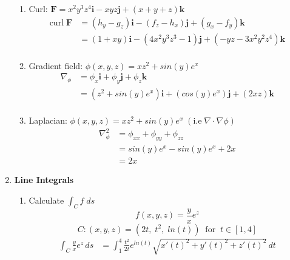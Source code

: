 \documentclass[11pt]{article}
\begin{document}
\begin{preview}
\begin{enumerate}
\begin{enumerate}
            \item Curl: $\textbf{F}=x^{2}y^{3}z^{4}\textbf{i} - xyz\textbf{j} + (x+y+z)\textbf{k}$
                  \begin{align*}
                    \mathrm{curl} \; \textbf{F} & = (h_y - g_z)\textbf{i} - (f_z - h_x)\textbf{j} + (g_x - f_y)\textbf{k}                      \\
                                                & = (1 + xy)\textbf{i} - (4x^{2}y^{3}z^{3} - 1)\textbf{j} + (-yz - 3x^{2}y^{2}z^{4})\textbf{k} \\
                  \end{align*}
            \item Gradient field: $\phi(x,y,z)=xz^{2}+sin(y)e^{x}$
                  \begin{align*}
                    \nabla_{\phi} & = \phi_{x}\textbf{i} + \phi_{y}\textbf{j} + \phi_{z}\textbf{k}                                                     \\
                                  & =  \left(z^{2} + sin(y)e^{x}\right) \textbf{i} + \left(cos(y)e^{x}\right) \textbf{j} + \left(2xz\right) \textbf{k} \\
                  \end{align*}
            \item Laplacian: $\phi(x,y,z)=xz^{2}+sin(y)e^{x} \; (\mathrm{i.e} \; \nabla{\cdot}\nabla\phi)$
                  \begin{align*}
                    \nabla_{\phi}^{2} & =  \phi_{xx} + \phi_{yy} + \phi_{zz} \\
                                      & =  sin(y)e^{x} - sin(y)e^{x} + 2x    \\
                                      & = 2x
                  \end{align*}
          \end{enumerate}
    \item \textbf{Line Integrals}
          \begin{enumerate}
            \item Calculate $\int_C f \; ds$
                  $$ f(x,y,z) = \frac{y}{x}e^z $$
                  $$C: (x,y,z) = (2t, \; t^2, \; ln(t)) \;\;\mathrm{for} \;\; t \in [1,4]$$
                  \begin{align*}
                    \int_C \frac{y}{x}e^z \,ds                                           & = \int_{1}^{4} \frac{t^2}{2t}e^{ln(t)} \sqrt{x'(t)^{2} + y'(t)^2 + z'(t)^2} \,dt        \\

\end{align*}
\end{enumerate}
\end{enumerate}
\end{preview}
\end{document}
